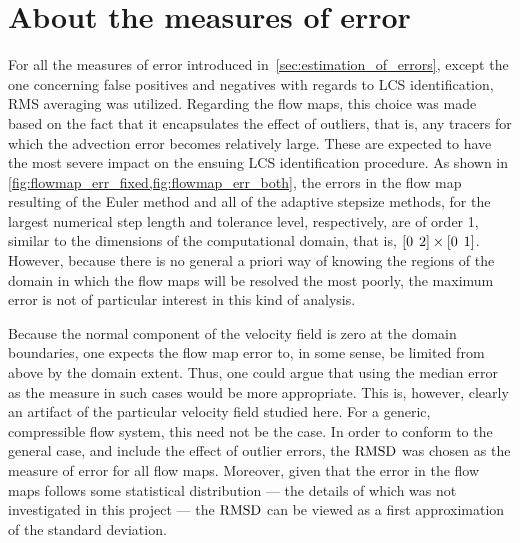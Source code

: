 \section{About the measures of error}
\label{sec:about_the_measures_of_error}

For all the measures of error introduced in~\cref{sec:estimation_of_errors},
except the one concerning false positives and negatives with regards to
LCS identification, RMS averaging was utilized. Regarding the flow maps,
this choice was made based on the fact that it encapsulates the effect of
outliers, that is, any tracers for which the advection error becomes
relatively large. These are expected to have the most severe impact on the
ensuing LCS identification procedure. As shown in
\cref{fig:flowmap_err_fixed,fig:flowmap_err_both}, the errors in the flow map
resulting of the Euler method and all of the adaptive stepsize methods, for the
largest numerical step length and tolerance level, respectively, are of order 1,
similar to the dimensions of the computational domain, that is,
$[0\hspace{1ex}2]\times[0\hspace{1ex}1]$. However, because there is no general
a priori way of knowing the regions of the domain in which the flow maps will be
resolved the most poorly, the maximum error is not of particular interest
in this kind of analysis.

Because the normal component of the velocity field is zero at the domain
boundaries, one expects the flow map error to, in some sense, be limited from
above by the domain extent. Thus, one could argue that using the median error
as the measure in such cases would be more appropriate. This is, however,
clearly an artifact of the particular velocity field studied here. For a
generic, compressible flow system, this need not be the case. In order to
conform to the general case, and include the effect of outlier errors, the
$\operatorname{RMSD}$ was chosen as the measure of error for all flow maps. Moreover, given
that the error in the flow maps follows some statistical distribution ---
the details of which was not investigated in this project --- the $\operatorname{RMSD}$
can be viewed as a first approximation of the standard deviation.

